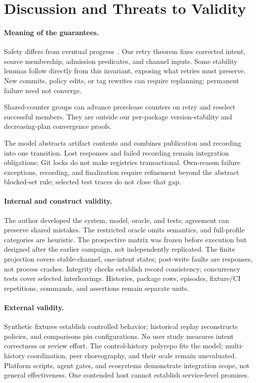 \section{Discussion and Threats to Validity}
\label{sec:threats}
\paragraph{Meaning of the guarantees.}
Safety differs from eventual progress~\cite{safety}. Our retry theorem fixes
corrected intent, source membership, admission predicates, and channel inputs.
Some stability lemmas follow directly from this invariant, exposing what retries
must preserve. New commits, policy edits, or tag rewrites can require replanning;
permanent failure need not converge.

Shared-counter groups can advance prerelease counters on retry and reselect
successful members. They are outside our per-package version-stability and
decreasing-plan convergence proofs.

The model abstracts artifact contents and combines publication and recording
into one transition. Lost responses and failed recording remain integration
obligations; Git locks do not make registries transactional. Own-reason failure
exceptions, recording, and finalization require refinement beyond the abstract
blocked-set rule; selected test traces do not close that gap.

\paragraph{Internal and construct validity.}
The author developed the system, model, oracle, and tests; agreement can preserve
shared mistakes. The restricted oracle omits semantics, and full-profile
categories are heuristic. The prospective matrix was frozen before execution
but designed after the earlier campaign, not independently replicated.
The finite projection covers stable-channel, one-intent states; post-write
faults are responses, not process crashes. Integrity checks establish record
consistency; concurrency tests cover selected interleavings. Histories, package
rows, episodes, fixture/CI repetitions, commands, and assertions remain
separate units.

\paragraph{External validity.}
Synthetic fixtures establish controlled behavior; historical replay reconstructs
policies, and comparisons pin configurations. No user study measures intent
correctness or review effort. The control-history polyrepo fits the model;
multi-history coordination, peer choreography, and their scale remain
unevaluated. Platform scripts, agent gates, and ecosystems demonstrate
integration scope, not general effectiveness. One contended host cannot
establish service-level promises.

